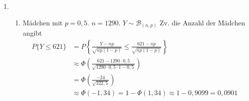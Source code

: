 \documentclass[a4paper]{scrartcl}
\begin{document}
\begin{enumerate}[label=\bfseries\arabic*.]
\begin{enumerate}[label=(\alph*)]
            \begin{proof}
            Wir wenden den ZGWS an
            \begin{align*}
            P\{Y>80\}&=1-P\{Y\le 80\}\\
            &=1-P\left\lbrace\frac{Y-n\cdot E(X_1)}{\sqrt{n\cdot Var X_1}}
            \le \frac{80-n\cdot E(X_1)}{\sqrt{n\cdot Var X_1}}\right\rbrace \\
            &\approx \Phi\left(\frac{80-100\cdot 0,7}{\sqrt{100\cdot 0,61}}\right)\\
            &= 1-\Phi\left(\frac{10}{\sqrt{61}}\right)\\
            &\approx 1-\Phi(1,2804)\approx 1-0,8997=0,1003
            \end{align*}
            \begin{align*}
            P\{Y>80\}&=P\{Y> 79,5\}\\
            &= 1-P\{Y\le 79,5\}\\
            &=1-P\left\{\frac{Y-n\cdot E(X_1)}{\sqrt{n\cdot Var X_1}}
            \le \frac{79,5-n\cdot E(X_1)}{\sqrt{n\cdot Var X_1}}\right\} \\
            &=\Phi\left(\frac{79,5-100\cdot 0,7}{\sqrt{100\cdot 0,61}}\right)\\
            &\approx 1-\Phi\left(\frac{9,5}{\sqrt{61}}\right)\\
            &\approx 1-\Phi(1,2163)\approx 1-0,8869=0,1131
            \end{align*}
            \end{proof}
            

        \end{enumerate}

    \item
        \begin{enumerate}[label=(\alph*)]
            \item Mädchen mit $p=0,5$. $n=1290$. $Y\sim \mathcal{B}_{(n,p)}$ Zv. die Anzahl der Mädchen angibt
            \begin{align*}
            P\{Y\le 621\}&=P\left\{\frac{Y-np}{\sqrt{np(1-p)}}\le\frac{621-np}{\sqrt{np(1-p)}}\right\}\\
            &\approx \Phi\left(\frac{621-1290\cdot 0,5}{\sqrt{1290\cdot 0,5\cdot 1-0,5}}\right)\\
            &=\Phi \left(\frac{-24}{\sqrt{322,5}}\right)\\
            &\approx \Phi(-1,34)=1-\Phi(1,34)\approx 1-0,9099=0,0901
            \end{align*}


\end{enumerate}
\end{enumerate}
\end{document}

